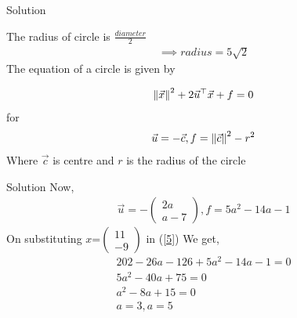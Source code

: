 \documentclass{beamer}
\begin{document}
\begin{frame}{Solution}


        The radius of circle is $\frac{diameter}{2}$
\begin{align*}
    \implies radius=5\sqrt{2}
    \end{align*}
     The equation of a circle is given by 
	
\begin{align}
	\norm{\vec{x}}^2 + 2 \vec{u}^{\top}\vec{x} + f = 0\label{5}
\end{align}
for
		\begin{align}
	 \vec{u}=-\vec{c}, f = \norm{\vec{c}}^2-r^2
		\end{align}
  Where $\vec{c}$ is centre and $r$ is the radius of the circle
\end{frame}
\begin{frame}{Solution}
    Now,
  \begin{align}
      \vec{u}=-\begin{pmatrix}2a\\a-7\end{pmatrix},f=5a^2-14a-1
  \end{align}
  On substituting $x$=$\begin{pmatrix}11\\-9\end{pmatrix}$ in (\ref{5}) We get, \\
  \begin{align*}
  202-26a-126+5a^2-14a-1=0\\
  5a^2-40a+75=0\\
  a^2-8a+15=0\\
  a=3,a=5
  \end{align*}
\end{frame}
\end{document}
